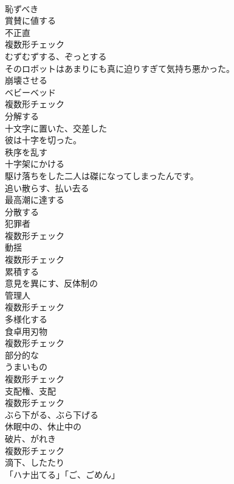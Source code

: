 \documentclass[8pt]{extreport}
\begin{document}
\begin{CJK}{UTF8}{min}
\\	[形容詞]	恥ずべき	
\\	[形容詞]	賞賛に値する	
\\	[名詞]	不正直	
\\	複数形チェック
\\	[形容詞]	むずむずする、ぞっとする	
\\	そのロボットはあまりにも真に迫りすぎて気持ち悪かった。	
\\	[動詞]	崩壊させる	
\\	[名詞]	ベビーベッド	
\\	複数形チェック
\\	[動詞]	分解する	
\\	[形容詞]	十文字に置いた、交差した	
\\	彼は十字を切った。	
\\	[形容詞]	秩序を乱す	
\\	[動詞]	十字架にかける	
\\	駆け落ちをした二人は磔になってしまったんです。	
\\	[動詞]	追い散らす、払い去る	
\\	[動詞]	最高潮に達する	
\\	[動詞]	分散する	
\\	[名詞]	犯罪者	
\\	複数形チェック
\\	[名詞]	動揺	
\\	複数形チェック
\\	[形容詞]	累積する	
\\	[形容詞]	意見を異にす、反体制の	
\\	[名詞]	管理人	
\\	複数形チェック
\\	[動詞]	多様化する	
\\	[名詞]	食卓用刃物	
\\	複数形チェック
\\	[形容詞]	部分的な	
\\	[名詞]	うまいもの	
\\	複数形チェック
\\	[名詞]	支配権、支配	
\\	複数形チェック
\\	[動詞]	ぶら下がる、ぶら下げる	
\\	[形容詞]	休眠中の、休止中の	
\\	[名詞]	破片、がれき	
\\	複数形チェック
\\	[名詞]	滴下、したたり	
\\	「ハナ出てる」「ご、ごめん」	

\end{CJK}
\end{document}
